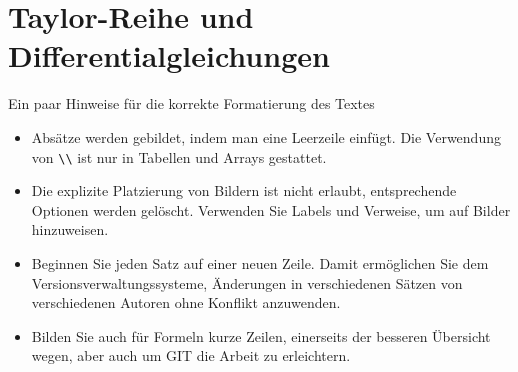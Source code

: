 %
%
%
\chapter{Taylor-Reihe und Differentialgleichungen\label{chapter:taylor}}
\begin{refsection}

Ein paar Hinweise für die korrekte Formatierung des Textes
\begin{itemize}
\item
Absätze werden gebildet, indem man eine Leerzeile einfügt.
Die Verwendung von \verb+\\+ ist nur in Tabellen und Arrays gestattet.
\item
Die explizite Platzierung von Bildern ist nicht erlaubt, entsprechende
Optionen werden gelöscht. 
Verwenden Sie Labels und Verweise, um auf Bilder hinzuweisen.
\item
Beginnen Sie jeden Satz auf einer neuen Zeile. 
Damit ermöglichen Sie dem Versionsverwaltungssysteme, Änderungen
in verschiedenen Sätzen von verschiedenen Autoren ohne Konflikt 
anzuwenden.
\item 
Bilden Sie auch für Formeln kurze Zeilen, einerseits der besseren
Übersicht wegen, aber auch um GIT die Arbeit zu erleichtern.
\end{itemize}






\printbibliography[heading=subbibliography]
\end{refsection}
